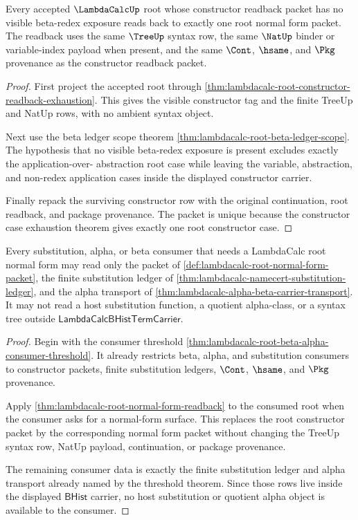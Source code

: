 \begin{theorem}
\label{thm:lambdacalc-root-normal-form-readback}
Every accepted $\LambdaCalcUp$ root whose constructor readback packet has no
visible beta-redex exposure reads back to exactly one root normal form packet.
The readback uses the same $\TreeUp$ syntax row, the same $\NatUp$ binder or
variable-index payload when present, and the same $\Cont$, $\hsame$, and
$\Pkg$ provenance as the constructor readback packet.
\end{theorem}
\begin{proof}
First project the accepted root through
\autoref{thm:lambdacalc-root-constructor-readback-exhaustion}. This gives the
visible constructor tag and the finite TreeUp and NatUp rows, with no ambient
syntax object.

Next use the beta ledger scope theorem
\autoref{thm:lambdacalc-root-beta-ledger-scope}. The hypothesis that no
visible beta-redex exposure is present excludes exactly the application-over-
abstraction root case while leaving the variable, abstraction, and non-redex
application cases inside the displayed constructor carrier.

Finally repack the surviving constructor row with the original continuation,
root readback, and package provenance. The packet is unique because the
constructor case exhaustion theorem gives exactly one root constructor case.
\end{proof}

\begin{theorem}
\label{thm:lambdacalc-root-substitution-normal-form-consumer}
Every substitution, alpha, or beta consumer that needs a LambdaCalc root normal
form may read only the packet of
\autoref{def:lambdacalc-root-normal-form-packet}, the finite substitution
ledger of \autoref{thm:lambdacalc-namecert-substitution-ledger}, and the alpha
transport of \autoref{thm:lambdacalc-alpha-beta-carrier-transport}. It may not
read a host substitution function, a quotient alpha-class, or a syntax tree
outside $\mathsf{LambdaCalcBHistTermCarrier}$.
\end{theorem}
\begin{proof}
Begin with the consumer threshold
\autoref{thm:lambdacalc-root-beta-alpha-consumer-threshold}. It already
restricts beta, alpha, and substitution consumers to constructor packets,
finite substitution ledgers, $\Cont$, $\hsame$, and $\Pkg$ provenance.

Apply \autoref{thm:lambdacalc-root-normal-form-readback} to the consumed root
when the consumer asks for a normal-form surface. This replaces the root
constructor packet by the corresponding normal form packet without changing
the TreeUp syntax row, NatUp payload, continuation, or package provenance.

The remaining consumer data is exactly the finite substitution ledger and
alpha transport already named by the threshold theorem. Since those rows live
inside the displayed $\mathsf{BHist}$ carrier, no host substitution or quotient
alpha object is available to the consumer.
\end{proof}
